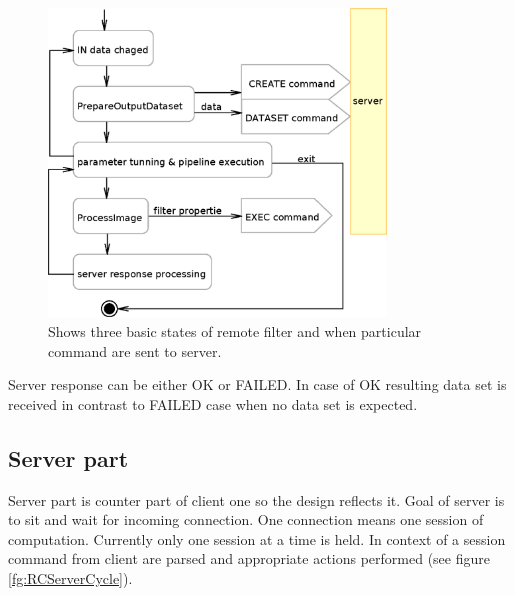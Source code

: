 \begin{figure}
    \centering
    \includegraphics[width=0.8\textwidth]{data/RCClientCycle}
    \caption[Remote MedV4D filter]{Shows three basic states of remote filter and when particular command are sent to server.}
    \label{fg:RCClientCycle}
\end{figure}

Server response can be either OK or FAILED.
In case of OK resulting data set is received in contrast to FAILED case when no data set is expected.

\subsection{Server part}

Server part is counter part of client one so the design reflects it.
Goal of server is to sit and wait for incoming connection.
One connection means one session of computation.
Currently only one session at a time is held.
In context of a session command from client are parsed and appropriate actions performed (see figure \ref{fg:RCServerCycle}).

